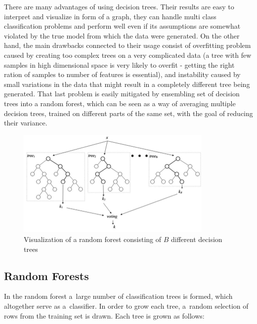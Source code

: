 There are many advantages of using decision trees. Their results are easy to interpret and visualize in form of a graph, they can handle multi class classification problems and perform well even if its assumptions are somewhat violated by the true model from which the data were generated. On the other hand, the main drawbacks connected to their usage consist of overfitting problem caused by creating too complex trees on a very complicated data (a tree with few samples in high dimensional space is very likely to overfit - getting the right ration of samples to number of features is essential), and instability caused by small variations in the data that might result in a completely different tree being generated. That last problem is easily mitigated by ensembling set of decision trees into a random forest, which can be seen as a way of averaging multiple decision trees, trained on different parts of the same set, with the goal of reducing their variance\cite{StatisticalLearning}.

\begin{figure}[htp]
	\centering
	\includegraphics[width=0.85\textwidth]{Figures/rf_visualization.jpg}
	\caption{Visualization of a random forest consisting of $B$ different decision trees}
	\label{fig:rf_visualization}\vspace{-3pt}
\end{figure}

\subsection{Random Forests}

In the random forest a~large number of classification trees is formed, which altogether serve as a~classifier. In order to grow each tree, a~random selection of rows from the training set is drawn. Each tree is grown as follows\cite{RandomForestWebpage}:

